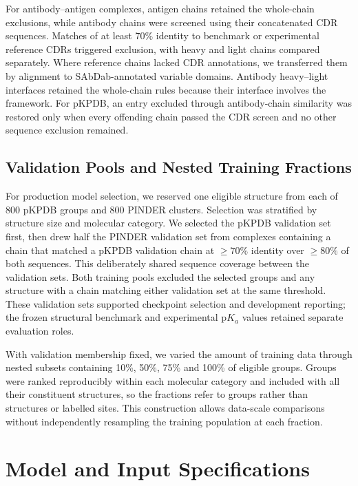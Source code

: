 For antibody--antigen complexes, antigen chains retained the whole-chain exclusions, while antibody chains were screened using their concatenated CDR sequences. Matches of at least 70\% identity to benchmark or experimental reference CDRs triggered exclusion, with heavy and light chains compared separately. Where reference chains lacked CDR annotations, we transferred them by alignment to SAbDab-annotated variable domains. Antibody heavy--light interfaces retained the whole-chain rules because their interface involves the framework. For pKPDB, an entry excluded through antibody-chain similarity was restored only when every offending chain passed the CDR screen and no other sequence exclusion remained.

\subsection{Validation Pools and Nested Training Fractions}
\label{app:jaxka-validation}

For production model selection, we reserved one eligible structure from each of 800 pKPDB groups and 800 PINDER clusters. Selection was stratified by structure size and molecular category. We selected the pKPDB validation set first, then drew half the PINDER validation set from complexes containing a chain that matched a pKPDB validation chain at $\geq 70\%$ identity over $\geq 80\%$ of both sequences. This deliberately shared sequence coverage between the validation sets. Both training pools excluded the selected groups and any structure with a chain matching either validation set at the same threshold. These validation sets supported checkpoint selection and development reporting; the frozen structural benchmark and experimental $\mathrm{p}K_a$ values retained separate evaluation roles.

With validation membership fixed, we varied the amount of training data through nested subsets containing 10\%, 50\%, 75\% and 100\% of eligible groups. Groups were ranked reproducibly within each molecular category and included with all their constituent structures, so the fractions refer to groups rather than structures or labelled sites. This construction allows data-scale comparisons without independently resampling the training population at each fraction.



\section{Model and Input Specifications}
\label{app:jaxka-model-specifications}

